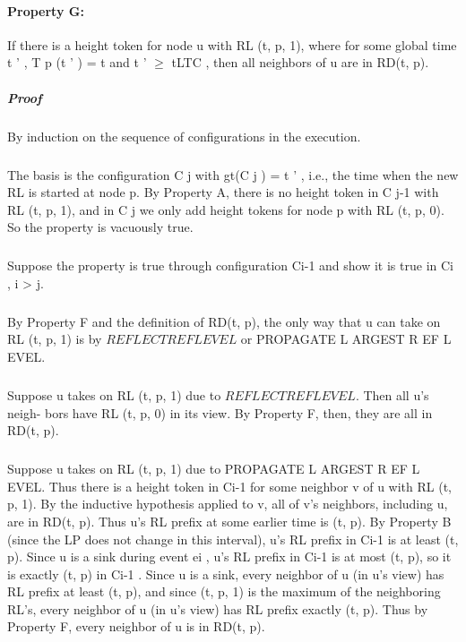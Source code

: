 \paragraph{Property G:} If there is a height token for node u with RL (t, p, 1), where for some global time t ' , T p (t ' ) = t and t ' $\geq$ tLTC , then all neighbors of u are in RD(t, p).
\subparagraph{Proof} By induction on the sequence of configurations in the execution.
\subparagraph{}The basis is the configuration C j with gt(C j ) = t ' , i.e., the time when the new RL is started at node p. By Property A, there is no height token in C j-1 with RL (t, p, 1), and in C j we only add height tokens for node p with RL (t, p, 0). So the property is vacuously true.
\subparagraph{}Suppose the property is true through configuration Ci-1 and show it is true in Ci , i > j.
\subparagraph{}By Property F and the definition of RD(t, p), the only way that u can take on RL (t, p, 1) is by $REFLECTREFLEVEL$ or PROPAGATE L ARGEST R EF L EVEL.
\subparagraph{}Suppose u takes on RL (t, p, 1) due to $REFLECTREFLEVEL$. Then all u's neigh- bors have RL (t, p, 0) in its view. By Property F, then, they are all in RD(t, p).
\subparagraph{}Suppose u takes on RL (t, p, 1) due to PROPAGATE L ARGEST R EF L EVEL. Thus there is a height token in Ci-1 for some neighbor v of u with RL (t, p, 1). By the inductive hypothesis applied to v, all of v's neighbors, including u, are in RD(t, p). Thus u's RL prefix at some earlier time is (t, p). By Property B (since the LP does not change in this interval), u's RL prefix in Ci-1 is at least (t, p). Since u is a sink during event ei , u's RL prefix in Ci-1 is at most (t, p), so it is exactly (t, p) in Ci-1 . Since u is a sink, every neighbor of u (in u's view) has RL prefix at least (t, p), and since (t, p, 1) is the maximum of the neighboring RL's, every neighbor of u (in u's view) has RL prefix exactly (t, p). Thus by Property F, every neighbor of u is in RD(t, p).

